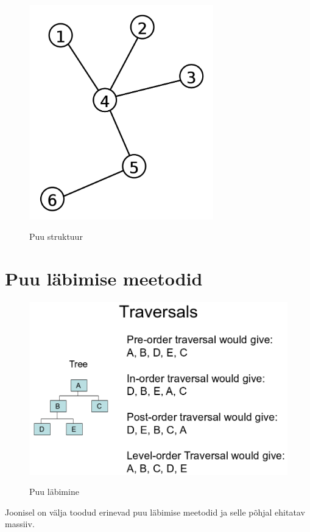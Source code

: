 \documentclass{trkut}
\begin{document}
\begin{appendices}
    \begin{figure}[H]%
    \includegraphics[width=8cm]{puu.png}%
    \caption{Puu struktuur}%
    \label{puu}%
    \end{figure}

\chapter{Puu läbimise meetodid}\label{lisa3}
    \tiny
    \normalsize
    \begin{figure}[H]%
    \includegraphics[width=14cm]{traversal.png}%
    \caption{Puu läbimine}%
    \label{pragmas}%
    \end{figure}
    Joonisel on välja toodud erinevad puu läbimise meetodid ja selle põhjal ehitatav massiiv\parencite{cohen}.


\end{appendices}
\end{document}

